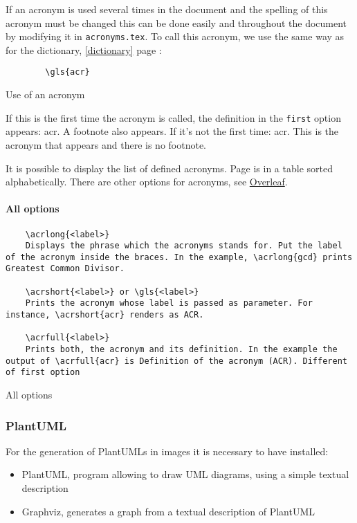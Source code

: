 If an acronym is used several times in the document and the spelling of this acronym must be changed
this can be done easily and throughout the document by modifying it in \verb=acronyms.tex=.
To call this acronym, we use the same way as for the dictionary, \ref{dictionary} page \pageref{dictionary} :
\begin{code}
    \begin{verbatim}
        \gls{acr}
\end{verbatim}
    \caption{Use of an acronym}
\end{code}

If this is the first time the acronym is called, the definition in the \verb=first= option appears: \gls{acr}.
A footnote also appears. \newline
If it's not the first time: \gls{acr}. This is the acronym that appears and there is no footnote. \newline

It is possible to display the list of defined acronyms. Page \pageref{acronym} is in a table sorted alphabetically.
There are other options for acronyms, see \href{https://fr.overleaf.com/learn/latex/Glossaries}{Overleaf}.

\paragraph{All options}

\begin{code}
    \begin{verbatim}
    \acrlong{<label>}
    Displays the phrase which the acronyms stands for. Put the label of the acronym inside the braces. In the example, \acrlong{gcd} prints Greatest Common Divisor.

    \acrshort{<label>} or \gls{<label>}
    Prints the acronym whose label is passed as parameter. For instance, \acrshort{acr} renders as ACR.

    \acrfull{<label>}
    Prints both, the acronym and its definition. In the example the output of \acrfull{acr} is Definition of the acronym (ACR). Different of first option
    \end{verbatim}
    \caption{All options}
\end{code}

\subsubsection{PlantUML}
For the generation of PlantUMLs in images it is necessary to have installed:
\begin{itemize}
    \item PlantUML, program allowing to draw UML diagrams, using a simple textual description
    \item Graphviz, generates a graph from a textual description of PlantUML
\end{itemize}

